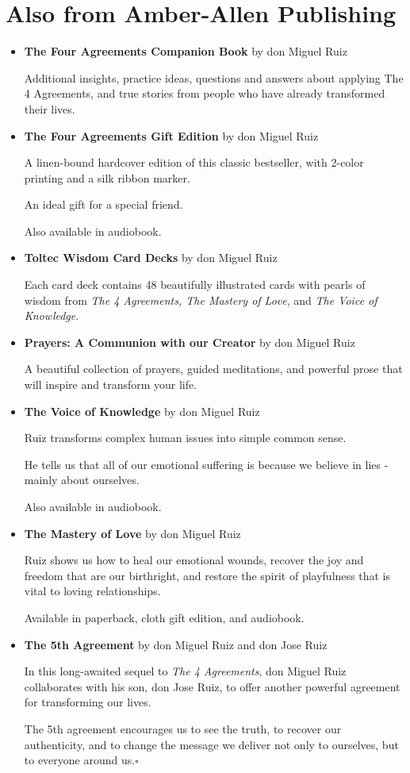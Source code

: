 \documentclass{article}
\numberwithin{equation}{section}
\begin{document}
\section*{Also from Amber-Allen Publishing}
\begin{itemize}
    \item \textbf{The Four Agreements Companion Book} by don Miguel Ruiz
    
    Additional insights, practice ideas, questions and answers about applying The 4 Agreements, and true stories from people who have already transformed their lives.
    \item \textbf{The Four Agreements Gift Edition} by don Miguel Ruiz
    
    A linen-bound hardcover edition of this classic bestseller, with 2-color printing and a silk ribbon marker.
    
    An ideal gift for a special friend.
    
    Also available in audiobook.
    \item \textbf{Toltec Wisdom Card Decks} by don Miguel Ruiz
    
    Each card deck contains 48 beautifully illustrated cards with pearls of wisdom from \textit{The 4 Agreements, The Mastery of Love}, and \textit{The Voice of Knowledge}.
    \item \textbf{Prayers: A Communion with our Creator} by don Miguel Ruiz
    
    A beautiful collection of prayers, guided meditations, and powerful prose that will inspire and transform your life.
    \item \textbf{The Voice of Knowledge} by don Miguel Ruiz
    
    Ruiz transforms complex human issues into simple common sense.
    
    He tells us that all of our emotional suffering is because we believe in lies - mainly about ourselves.
    
    Also available in audiobook.
    \item \textbf{The Mastery of Love} by don Miguel Ruiz
    
    Ruiz shows us how to heal our emotional wounds, recover the joy and freedom that are our birthright, and restore the spirit of playfulness that is vital to loving relationships.
    
    Available in paperback, cloth gift edition, and audiobook.
    \item \textbf{The 5th Agreement} by don Miguel Ruiz and don Jose Ruiz
    
    In this long-awaited sequel to \textit{The 4 Agreements}, don Miguel Ruiz collaborates with his son, don Jose Ruiz, to offer another powerful agreement for transforming our lives.
    
    The 5th agreement encourages us to see the truth, to recover our authenticity, and to change the message we deliver not only to ourselves, but to everyone around us.\hfill$\square$
\end{itemize}


\printbibliography[heading=bibintoc]
\end{document}
